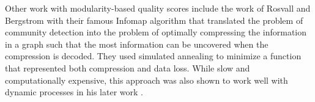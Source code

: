 \documentclass{report}
\begin{document}
	
	Other work with modularity-based quality scores include the work of Rosvall and Bergstrom with their famous Infomap algorithm \cite{rosvall2007information} that translated the problem of community detection into the problem of optimally compressing the information in a graph such that the most information can be uncovered when the compression is decoded. 
	They used simulated annealing to minimize a function that represented both compression and data loss. 
	While slow and computationally expensive, this approach was also shown to work well with dynamic processes in his later work \cite{rosvall2008maps}. 
	
	
\end{document}
